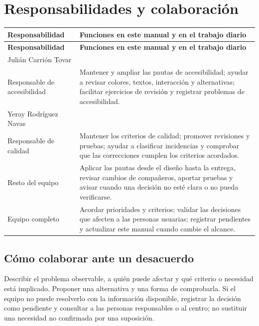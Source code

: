 \section{Responsabilidades y colaboración}

\begin{longtable}{p{}p{}}
\toprule
\textbf{Responsabilidad} & \textbf{Funciones en este manual y en el trabajo diario} \\
\midrule
\endfirsthead
\toprule
\textbf{Responsabilidad} & \textbf{Funciones en este manual y en el trabajo diario} \\
\midrule
\endhead
Julián Carrión Tovar\\Responsable de accesibilidad & Mantener y ampliar las pautas de accesibilidad; ayudar a revisar colores, textos, interacción y alternativas; facilitar ejercicios de revisión y registrar problemas de accesibilidad. \\
\addlinespace
Yeray Rodríguez Navas\\Responsable de calidad & Mantener los criterios de calidad; promover revisiones y pruebas; ayudar a clasificar incidencias y comprobar que las correcciones cumplen los criterios acordados. \\
\addlinespace
Resto del equipo & Aplicar las pautas desde el diseño hasta la entrega, revisar cambios de compañeros, aportar pruebas y avisar cuando una decisión no esté clara o no pueda verificarse. \\
\addlinespace
Equipo completo & Acordar prioridades y criterios; validar las decisiones que afecten a las personas usuarias; registrar pendientes y actualizar este manual cuando cambie el alcance. \\
\bottomrule
\end{longtable}

\subsection{Cómo colaborar ante un desacuerdo}
Describir el problema observable, a quién puede afectar y qué criterio o necesidad está implicado. Proponer una alternativa y una forma de comprobarla. Si el equipo no puede resolverlo con la información disponible, registrar la decisión como pendiente y consultar a las personas responsables o al centro; no sustituir una necesidad no confirmada por una suposición.